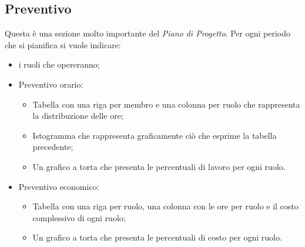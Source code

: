 \subsection{Preventivo}
Questa è una sezione molto importante del \textit{Piano di Progetto}.
Per ogni periodo che si pianifica si vuole indicare:
\begin{itemize}
    \item i ruoli che opereranno;
    \item Preventivo orario:
        \begin{itemize}
            \item Tabella con una riga per membro e una colonna per ruolo che rappresenta la distribuzione delle ore;
            \item Istogramma che rappresenta graficamente ciò che esprime la tabella precedente;
            \item Un grafico a torta che presenta le percentuali di lavoro per ogni ruolo.
        \end{itemize}
    \item Preventivo economico:
        \begin{itemize}
            \item Tabella con una riga per ruolo, una colonna con le ore per ruolo e il costo complessivo di ogni ruolo;
            \item Un grafico a torta che presenta le percentuali di costo per ogni ruolo.
        \end{itemize}
\end{itemize}

